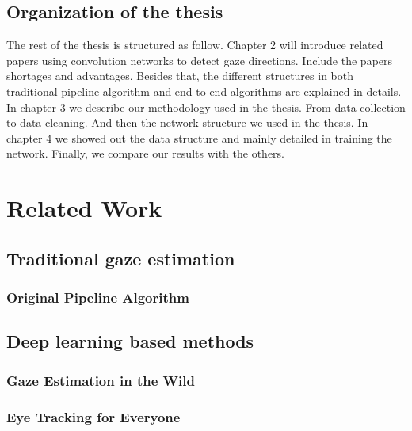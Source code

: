 \documentclass[senior]{IPSstyle}
\begin{document}


\section{Organization of the thesis}
The rest of the thesis is structured as follow.
Chapter 2 will introduce related papers using convolution networks to detect gaze directions.
Include the papers shortages and advantages.
Besides that, the different structures in both traditional pipeline algorithm and end-to-end algorithms are explained in details.
In chapter 3 we describe our methodology used in the thesis.
From data collection to data cleaning.
And then the network structure we used in the thesis.
In chapter 4 we showed out the data structure and mainly detailed in training the network.
Finally, we compare our results with the others.

\chapter{Related Work} \label{related_work}


\section{Traditional gaze estimation}
\subsection{Original Pipeline Algorithm}
\section{Deep learning based methods}
\subsection{Gaze Estimation in the Wild}
\subsection{Eye Tracking for Everyone}

\end{document}
